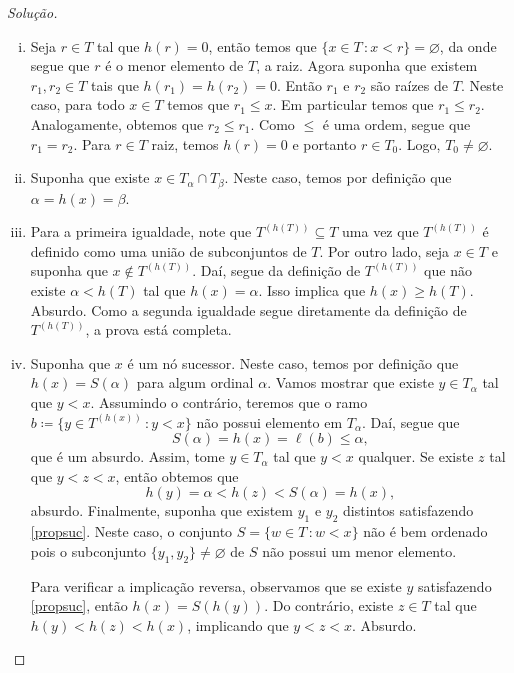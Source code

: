 \documentclass[a4paper]{article}
\begin{document}
\begin{proof}[Solução]\hfill
  \begin{enumerate}[(i)]

  \item Seja \(r\in T\) tal que \(h(r)=0\), então temos que \(\{x\in T\,\colon
    x<r\}=\varnothing\), da onde segue que \(r\) é o menor elemento de \(T\), a raiz.
    Agora suponha que existem \(r_1, r_2\in T\) tais que \(h(r_1)=h(r_2)=0\). Então \(r_1\) e
    \(r_2\) são raízes de \(T\). Neste caso,  para todo \(x\in T\) temos que
    \(r_1\leq x\). Em particular temos que \(r_1\leq r_2\).
    Analogamente, obtemos que \(r_2\leq r_1\). Como \(\leq\) é
    uma ordem, segue que \(r_1=r_2\). Para \(r\in T\) raiz, temos \(h(r)=0\) e portanto
    \(r\in T_0\). Logo, \(T_0\not=\varnothing\).
    
  \item Suponha que existe \(x\in T_\alpha\cap T_\beta\). Neste caso, temos por
    definição que \(\alpha=h(x)=\beta\).

  \item Para a primeira igualdade, note que \(T^{(h(T))}\subseteq T\) uma vez
    que \(T^{(h(T))}\) é definido como uma união de subconjuntos de \(T\). Por
    outro lado, seja \(x\in T\) e suponha que \(x\not\in T^{(h(T))}\). Daí,
    segue da definição de \(T^{(h(T))}\) que não existe \(\alpha < h(T)\) tal
    que \(h(x)=\alpha\). Isso implica
    que \(h(x)\geq h(T)\). Absurdo. Como a segunda igualdade segue diretamente da
    definição de \(T^{(h(T))}\), a prova está completa. 

  \item Suponha que \(x\) é um nó sucessor. Neste caso, temos por definição
    que \(h(x)=S(\alpha)\) para algum ordinal \(\alpha\). Vamos mostrar que
    existe \(y\in T_\alpha\) tal que \(y < x\). Assumindo o contrário, teremos
    que o ramo \(b\coloneqq\{y\in T^{(h(x))}\,\colon y<x\}\) não possui elemento em
    \(T_\alpha\). Daí, segue que \[S(\alpha)=h(x)=\ell(b)\leq\alpha,\] que é um absurdo. 
    Assim, tome \(y\in T_\alpha\) tal que \(y<x\) qualquer. Se
    existe \(z\) tal que \(y<z<x\), então obtemos
    que \[h(y)=\alpha<h(z)<S(\alpha)=h(x),\] 
    absurdo. Finalmente, suponha que existem \(y_1\) e \(y_2\) distintos satisfazendo
    \eqref{propsuc}. Neste caso, o conjunto \(S=\{w\in
    T\,\colon w <x\}\) não é bem ordenado pois o subconjunto
    \(\{y_1,y_2\}\not = \varnothing\) de \(S\) não possui um menor elemento.

    Para verificar a implicação reversa, observamos que se existe \(y\) satisfazendo
    \eqref{propsuc}, então \(h(x)=S(h(y))\). Do contrário, existe \(z\in T\) tal
    que \(h(y)<h(z)<h(x)\), implicando que \(y<z<x\). Absurdo.


\end{enumerate}
\end{proof}
\end{document}
